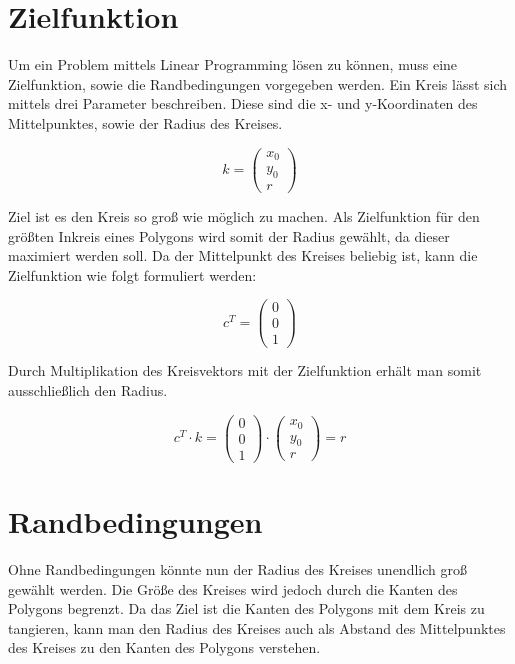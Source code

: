 \documentclass[12pt]{scrartcl}
\begin{document}
\section{Zielfunktion}
Um ein Problem mittels Linear Programming lösen zu können, muss eine Zielfunktion, sowie die Randbedingungen vorgegeben werden.
Ein Kreis lässt sich mittels drei Parameter beschreiben. Diese sind die x- und y-Koordinaten des Mittelpunktes, sowie der Radius des Kreises.

\begin{equation}
    k = \begin{pmatrix} x_0 \\ y_0 \\ r \end{pmatrix}
\end{equation}

Ziel ist es den Kreis so groß wie möglich zu machen.
Als Zielfunktion für den größten Inkreis eines Polygons wird somit der Radius gewählt, da dieser maximiert werden soll. Da der Mittelpunkt des Kreises beliebig ist, kann die Zielfunktion wie folgt formuliert werden:

\begin{equation}
    c^T = \begin{pmatrix} 0 \\ 0 \\ 1 \end{pmatrix}
\end{equation}

Durch Multiplikation des Kreisvektors mit der Zielfunktion erhält man somit ausschließlich den Radius.

\begin{equation}
    c^T \cdot k = \begin{pmatrix} 0 \\ 0 \\ 1 \end{pmatrix} \cdot \begin{pmatrix} x_0 \\ y_0 \\ r \end{pmatrix} = r
\end{equation}

\section{Randbedingungen}
Ohne Randbedingungen könnte nun der Radius des Kreises unendlich groß gewählt werden.
Die Größe des Kreises wird jedoch durch die Kanten des Polygons begrenzt.
Da das Ziel ist die Kanten des Polygons mit dem Kreis zu tangieren, kann man den Radius des Kreises auch als Abstand des Mittelpunktes des Kreises zu den Kanten des Polygons verstehen.
\end{document}
